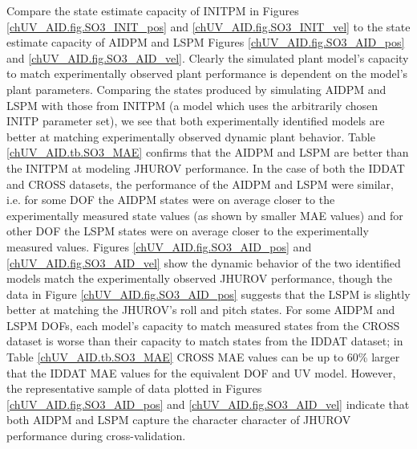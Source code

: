Compare the state estimate capacity of \ac{INITPM} in Figures
\ref{chUV_AID.fig.SO3_INIT_pos} and \ref{chUV_AID.fig.SO3_INIT_vel} to
the state estimate capacity of \ac{AIDPM} and \ac{LSPM} Figures
\ref{chUV_AID.fig.SO3_AID_pos} and \ref{chUV_AID.fig.SO3_AID_vel}.
Clearly the simulated plant model's capacity to match experimentally
observed plant performance is dependent on the model's plant
parameters.
%
Comparing the states produced by simulating \ac{AIDPM} and \ac{LSPM}
with those from \ac{INITPM} (a model which uses the arbitrarily chosen
\ac{INITP} parameter set), we see that both experimentally identified
models are better at matching experimentally observed dynamic plant
behavior.
%
Table \ref{chUV_AID.tb.SO3_MAE} confirms that the \ac{AIDPM} and
\ac{LSPM} are better than the \ac{INITPM} at modeling \ac{JHUROV}
performance.
%
In the case of both the \ac{IDDAT} and \ac{CROSS} datasets, the
performance of the \ac{AIDPM} and \ac{LSPM} were similar, i.e.  for
some \ac{DOF} the \ac{AIDPM} states were on average closer to the
experimentally measured state values (as shown by smaller \ac{MAE}
values) and for other \ac{DOF} the \ac{LSPM} states were on average
closer to the experimentally measured values.
%
Figures \ref{chUV_AID.fig.SO3_AID_pos} and
\ref{chUV_AID.fig.SO3_AID_vel} show the dynamic behavior of the two
identified models match the experimentally observed \ac{JHUROV}
performance, though the data in Figure \ref{chUV_AID.fig.SO3_AID_pos}
suggests that the \ac{LSPM} is slightly better at matching the
\ac{JHUROV}'s roll and pitch states.
%
For some \ac{AIDPM} and \ac{LSPM} \acp{DOF}, each model's capacity to
match measured states from the \ac{CROSS} dataset is worse
than their capacity to match states from the \ac{IDDAT} dataset;
%  
in Table \ref{chUV_AID.tb.SO3_MAE} \ac{CROSS} \ac{MAE} values can be
up to 60\% larger that the \ac{IDDAT} \ac{MAE} values for the
equivalent \ac{DOF} and \ac{UV} model.  
%
However, the representative sample of data plotted in Figures
\ref{chUV_AID.fig.SO3_AID_pos} and \ref{chUV_AID.fig.SO3_AID_vel}
indicate that both \ac{AIDPM} and \ac{LSPM} capture the character
character of \ac{JHUROV} performance during cross-validation.


